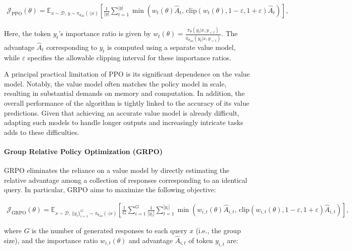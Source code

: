 \begin{align}
\mathcal{J}_\text{PPO}(\theta) = \mathbb{E}_{ x \sim \mathcal{D},\, y \sim \pi_{\theta_\text{old}}( \cdot | x) }
\left[ \frac{1}{|y|} \sum_{t=1}^{|y|} 
\min \left( w_{t}(\theta) \widehat{A}_{t},  \, \mathrm{clip} \left( w_{t}(\theta), 1 - {\varepsilon}, 1 + {\varepsilon}\right) \widehat{A}_{t} \right)
\right],
\end{align}

Here, the token $y_t$’s importance ratio is given by $ w_{t}(\theta) = \frac{ \pi_{\theta} (y_{t} | x, y_{<t}) }{ \pi_{\theta_\text{old}} (y_{t} | x,y_{<t})} $. The advantage $\widehat{A}_{t}$ corresponding to $y_t$ is computed using a separate value model, while $\varepsilon$ specifies the allowable clipping interval for these importance ratios.

A principal practical limitation of PPO is its significant dependence on the value model. Notably, the value model often matches the policy model in scale, resulting in substantial demands on memory and computation. In addition, the overall performance of the algorithm is tightly linked to the accuracy of its value predictions. Given that achieving an accurate value model is already difficult, adapting such models to handle longer outputs and increasingly intricate tasks adds to these difficulties.

\paragraph{Group Relative Policy Optimization (GRPO)} GRPO \citep{grpo} eliminates the reliance on a value model by directly estimating the relative advantage among a collection of responses corresponding to an identical query. In particular, GRPO aims to maximize the following objective:

\begin{align}
\label{equ:grpo}
\mathcal{J}_\text{GRPO}(\theta) = \mathbb{E}_{ x \sim \mathcal{D},\, \{y_i\}_{i=1}^G \sim \pi_{\theta_\text{old}}( \cdot | x) }
\left[ \frac{1}{G} \sum_{i=1}^{G} \frac{1}{|y_i|} \sum_{t=1}^{|y_i|} 
\min \left( w_{i,t}(\theta) \widehat{A}_{i,t},  \, \mathrm{clip} \left( w_{i,t}(\theta), 1 - {\varepsilon}, 1 + {\varepsilon}\right) \widehat{A}_{i,t} \right)
\right],
\end{align}

where $G$ is the number of generated responses to each query $x$ (i.e., the group size), and the importance ratio $w_{i,t}(\theta)$ and advantage $\widehat{A}_{i,t}$ of token $y_{i,t}$ are:

